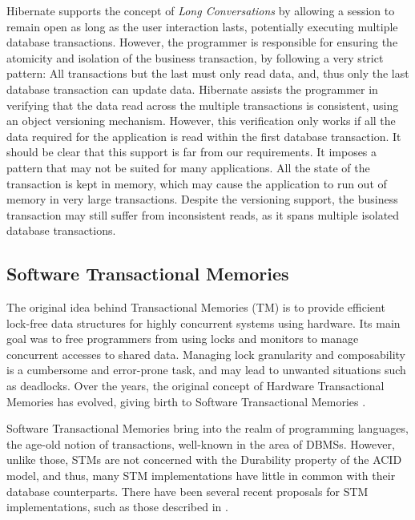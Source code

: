 \documentclass{llncs}
\begin{document}
Hibernate supports the concept of {\it Long Conversations} by allowing
a session to remain open as long as the user interaction lasts,
potentially executing multiple database transactions. However, the
programmer is responsible for ensuring the atomicity and isolation of
the business transaction, by following a very strict pattern: All
transactions but the last must only read data, and, thus only the last
database transaction can update data. Hibernate assists the programmer
in verifying that the data read across the multiple transactions is
consistent, using an object versioning mechanism. However, this
verification only works if all the data required for the application
is read within the first database transaction. It should be clear that
this support is far from our requirements. It imposes a pattern that
may not be suited for many applications.  All the state of the
transaction is kept in memory, which may cause the application to run
out of memory in very large transactions. Despite the versioning
support, the business transaction may still suffer from inconsistent
reads, as it spans multiple isolated database transactions.


\subsection{Software Transactional Memories}
\label{sec:stm}

The original idea behind Transactional Memories (TM)
\cite{herlihy1993transactional} is to provide efficient lock-free data
structures for highly concurrent systems using hardware. Its main goal
was to free programmers from using locks and monitors to manage
concurrent accesses to shared data. Managing lock granularity and
composability is a cumbersome and error-prone task, and may lead to
unwanted situations such as deadlocks. Over the years, the original
concept of Hardware Transactional Memories has evolved, giving birth
to Software Transactional Memories \cite{shavit1997software}.

Software Transactional Memories bring into the realm of programming
languages, the age-old notion of transactions, well-known in the area
of DBMSs. However, unlike those, STMs are not concerned with the
Durability property of the ACID model, and thus, many STM
implementations have little in common with their database
counterparts. There have been several recent proposals for STM
implementations, such as those described in
\cite{cachopo2006versioned, herlihy2003software, marathe2005adaptive,
  dice2006transactional, riegel2006lazy, marathe2006lowering}.
\end{document}
